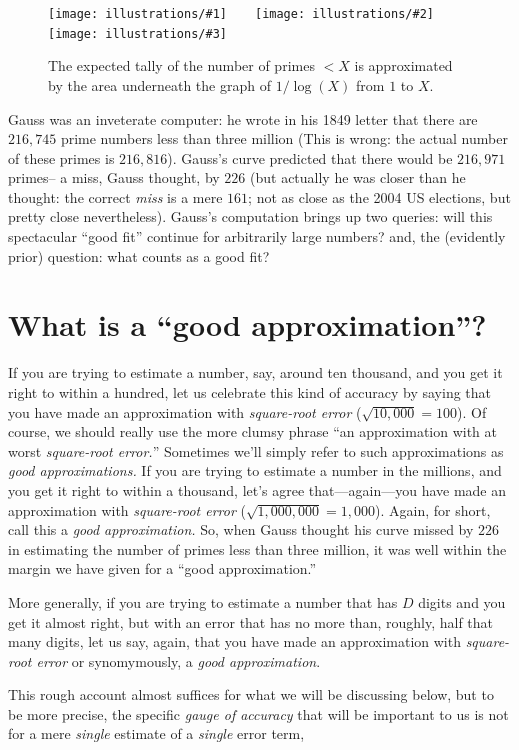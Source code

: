 \documentclass[11pt]{article}
\newcommand{\illthree}[5]{ 
   \begin{figure}[htbp]
   \begin{center}
   \texttt{[image: illustrations/\#1]}$\qquad$\texttt{[image: illustrations/\#2]}$\qquad$\texttt{[image: illustrations/\#3]}
   \caption{#5}
    \end{center}
    \end{figure}
}
\theoremstyle{plain}
\theoremstyle{definition}
\numberwithin{equation}{section}
\numberwithin{figure}{section}
\numberwithin{table}{section}
\begin{document}
\illthree{area_under_graph_30}{area_under_graph_100}{area_under_graph_1000}{.3}{The
  expected tally of the number of primes $<X$ is approximated by the
  area underneath the graph of $1/\log(X)$ from $1$ to $X$.}

           
Gauss was an inveterate computer: he wrote in his 1849 letter that
there are $216,\!745$ prime numbers less than three million (This is
wrong: the actual number of these primes is $216,\!816$). Gauss's curve
predicted that there would be $216,\!971$ primes-- a miss, Gauss
thought, by $226$ (but actually he was closer than he thought: the
correct {\em miss} is a mere $161$; not as close as the 2004 US
elections, but pretty close nevertheless).  
Gauss's computation brings up two queries: will this spectacular ``good
fit'' continue for arbitrarily large numbers? and, the (evidently
prior) question: what counts as a good fit?


\section{What is a ``good approximation''?}\label{sec:sqrterror}

If you are trying to estimate a number, say, around ten thousand, and
you get it right to within a hundred, let us celebrate this kind of
accuracy by saying that you have made an approximation with {\em
  square-root error} (${\sqrt{10,\!000}}=100$). Of course, we should
really use the more clumsy phrase ``an approximation with at worst
{\em square-root error.}''  Sometimes we'll simply refer to such
approximations as {\em good approximations.} If you are trying to
estimate a number in the millions, and you get it right to within a
thousand, let's agree that---again---you have made an approximation
with {\em square-root error} (${\sqrt{1,\!000,\!000}}=1,\!000$).
Again, for short, call this a {\em good approximation.} So, when Gauss
thought his curve missed by $226$ in estimating the number of primes
less than three million, it was well within the margin we have given
for a ``good approximation.''

More generally, if you are trying to estimate a number that has $D$
digits and you get it almost right, but with an error that has no more
than, roughly, half that many digits, let us say, again, that you have
made an approximation with {\em square-root error} or synomymously, a
{\em good approximation}.


This rough account almost suffices for what we will be discussing
below, but to be more precise, the specific {\em gauge of accuracy}
that will be important to us is not for a mere {\em single} estimate
of a {\em single} error term, \bigskip
 
\end{document}
